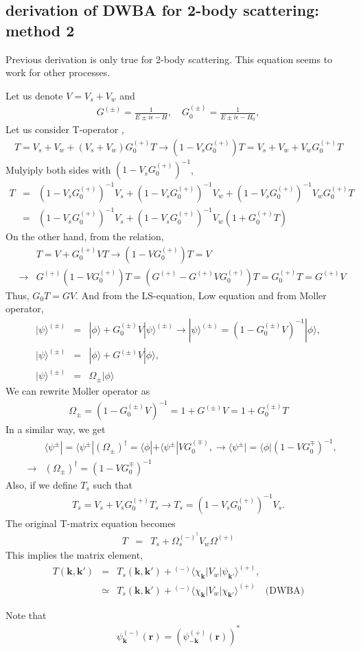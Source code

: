 \documentclass[10pt]{book}
\def\bm{\boldsymbol}
\newcommand{\bea}{\begin{eqnarray}}
\newcommand{\eea}{\end{eqnarray}}
\newcommand{\no}{\nonumber \\}
\def\vk{{\bm k}}
\def\vr{{\bm r}}
\def\la{\langle}
\def\ra{\rangle}
\begin{document}
\subsection{derivation of DWBA for 2-body scattering: method 2}
Previous derivation is only true for 2-body scattering.
This equation seems to work for other processes.

Let us denote $V=V_s+V_w$ and 
\bea 
G^{(\pm)}=\frac{1}{E\pm i\epsilon-H},
\quad G_0^{(\pm)}=\frac{1}{E\pm i\epsilon-H_0},
\eea 
Let us consider T-operator ,
\bea 
 T= V_s+V_w+(V_s+V_w) G_0^{(+)}T \to (1-V_sG^{(+)}_0)T=V_s+V_w+V_w G_0^{(+)} T
\eea 
Mulyiply both sides with $(1-V_s G_0^{(+)})^{-1}$,
\bea 
T&=&(1-V_s G^{(+)}_0)^{-1}V_s+(1-V_s G^{(+)}_0)^{-1}V_w+(1-V_s G^{(+)}_0)^{-1}V_w G^{(+)}_0 T\no 
 &=&(1-V_s G^{(+)}_0)^{-1}V_s+(1-V_s G^{(+)}_0)^{-1}V_w (1+G^{(+)}_0 T) 
\eea 
On the other hand, from the relation,
\bea 
& &T=V+G^{(+)}_0 V T \to (1-VG^{(+)}_0)T=V  \no 
&\to& G^{(+)}(1-VG^{(+)}_0)T=(G^{(+)}-G^{(+)}VG^{(+)}_0)T=G^{(+)}_0T=G^{(+)} V  
\eea 
Thus, $G_0T=GV$. And from the LS-equation, Low equation and 
from Moller operator,
\bea 
|\psi\ra^{(\pm)}&=&|\phi\ra+G_0^{(\pm)} V |\psi\ra^{(\pm)} \to 
                    |\psi\ra^{(\pm)}=(1-G_0^{(\pm)}V)^{-1}|\phi\ra ,\no  
|\psi\ra^{(\pm)}&=&|\phi\ra+G^{(\pm)}V |\phi\ra,\no 
|\psi\ra^{(\pm)}&=& \Omega_{\pm}|\phi\ra
\eea 
We can rewrite Moller operator as 
\bea 
\Omega_{\pm}=(1-G_0^{(\pm)}V)^{-1}=1+G^{(\pm)}V =1+G_0^{(\pm)} T
\eea 
In a similar way, we get 
\bea 
& &\la \psi^{\pm}|=\la \psi^{\pm}| (\Omega_{\pm})^\dagger=
\la \phi|+\la \psi^{\pm}|V G_0^{(\mp)},\to \la \psi^{\pm}|=\la\phi|(1-V G_0^{\mp})^{-1} ,\no 
&\to &(\Omega_{\pm})^\dagger=(1-V G_0^{\mp})^{-1}
\eea 
Also, if we define $T_s$ such that 
\bea 
T_s=V_s+V_s G_0^{(+)} T_s \to T_s=(1-V_s G_0^{(+)})^{-1} V_s.
\eea 
The original T-matrix equation becomes
\bea 
T &=&T_s+\Omega_s^{(-)^\dagger} V_w \Omega^{(+)}
\eea 
This implies the matrix element,
\bea 
T(\vk,\vk') &=& T_s(\vk,\vk') +{}^{(-)}\la \chi_\vk|V_w|\psi_{\vk'} \ra^{(+)},\no 
            &\simeq & T_s(\vk,\vk') +{}^{(-)}\la \chi_\vk|V_w|\chi_{\vk'} \ra^{(+)}\quad 
            \mbox{(DWBA)}
\eea 

Note that
\bea 
\psi_{\vk}^{(-)}(\vr)= \left( \psi_{-\vk}^{(+)}(\vr)\right)^* 
\eea 
\end{document}
